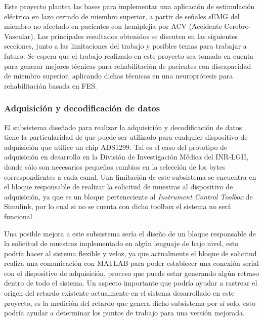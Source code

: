 Este proyecto plantea las bases para implementar una aplicación de estimulación eléctrica en lazo cerrado de miembro superior, a partir de señales sEMG del miembro no afectado en pacientes con hemiplejia por ACV (Accidente Cerebro-Vascular). Los principales resultados obtenidos se discuten en las siguientes secciones, junto a las limitaciones del trabajo y posibles temas para trabajar a futuro. Se espera que el trabajo realizado en este proyecto sea tomado en cuenta para generar mejores técnicas para rehabilitación de pacientes con discapacidad de miembro superior, aplicando dichas técnicas en una neuroprótesis para rehabilitación basada en FES.

\subsubsection*{Adquisición y decodificación de datos}
El subsistema diseñado para realizar la adquisición y decodificación de datos tiene la particularidad de que puede ser utilizado para cualquier dispositivo de adquisición que utilice un chip ADS1299. Tal es el caso del prototipo de adquisición en desarrollo en la División de Investigación Médica del INR-LGII, donde sólo son necesarios pequeños cambios en la selección de los bytes correspondientes a cada canal. Una limitación de este subsistema se encuentra en el bloque responsable de realizar la solicitud de muestras al dispositivo de adquisición, ya que es un bloque perteneciente al \emph{Instrument Control Toolbox} de Simulink\textregistered, por lo cual si no se cuenta con dicho toolbox el sistema no será funcional.

Una posible mejora a este subsistema sería el diseño de un bloque responsable de la solicitud de muestras implementado en algún lenguaje de bajo nivel, esto podría hacer al sistema flexible y veloz, ya que actualmente el bloque de solicitud realiza una comunicación con MATLAB\textregistered \; para poder establecer una conexión serial con el dispositivo de adquisición, proceso que puede estar generando algún retraso dentro de todo el sistema. Un aspecto importante que podría ayudar a rastrear el origen del retardo existente actualmente en el sistema desarrollado en este proyecto, es la medición del retardo que genera dicho subsistema por sí solo, esto podría ayudar a determinar los puntos de trabajo para una versión mejorada.

